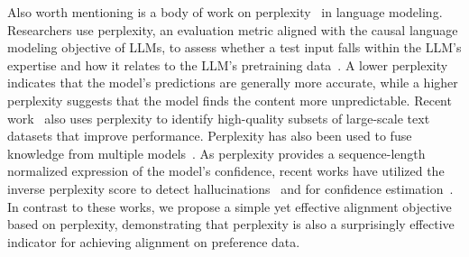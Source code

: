 Also worth mentioning is a body of work on perplexity~\citep{jelinek1977perplexity} in language modeling. Researchers use perplexity, an evaluation metric aligned with the causal language modeling objective of LLMs, to assess whether a test input falls within the LLM’s expertise and how it relates to the LLM’s pretraining data~\citep{chenlonglora,marion2023less,gonen2023demystifying}. A lower perplexity indicates that the model’s predictions are generally more accurate, while a higher perplexity suggests that the model finds the content more unpredictable. Recent work~\citep{ankner2024perplexed,muennighoff2024scaling} also uses perplexity to identify high-quality subsets of large-scale text datasets that improve performance. Perplexity has also been used to fuse knowledge from multiple models~\citep{mavromatis2024pack}. As perplexity provides a sequence-length normalized expression of the model’s confidence, recent works have utilized the inverse perplexity score to detect hallucinations~\citep{valentin2024cost} and for confidence estimation~\citep{liu2024litcab}. In contrast to these works, we propose a simple yet effective alignment objective based on perplexity, demonstrating that perplexity is also a surprisingly effective indicator for achieving alignment on preference data. 



 

